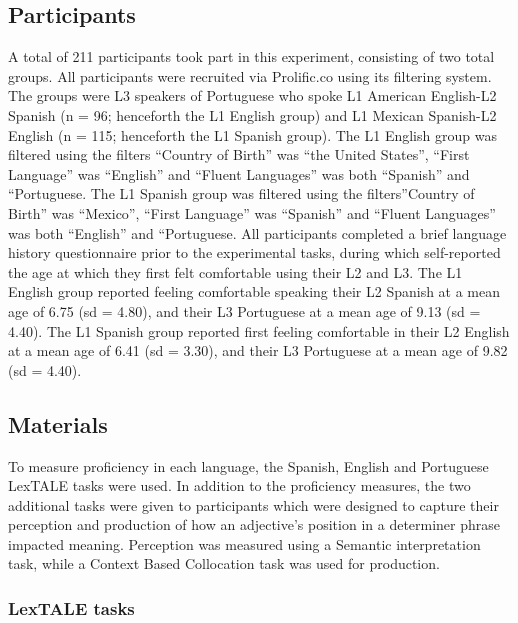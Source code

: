 \documentclass[
  man]{apa6}
\begin{document}
\hypertarget{participants}{%
\subsection{Participants}\label{participants}}

A total of 211 participants took part in this experiment, consisting of two total groups.
All participants were recruited via Prolific.co using its filtering system.
The groups were L3 speakers of Portuguese who spoke L1 American English-L2 Spanish (n = 96; henceforth the L1 English group) and L1 Mexican Spanish-L2 English (n = 115; henceforth the L1 Spanish group).
The L1 English group was filtered using the filters ``Country of Birth'' was ``the United States'', ``First Language'' was ``English'' and ``Fluent Languages'' was both ``Spanish'' and ``Portuguese.
The L1 Spanish group was filtered using the filters''Country of Birth'' was ``Mexico'', ``First Language'' was ``Spanish'' and ``Fluent Languages'' was both ``English'' and ``Portuguese.
All participants completed a brief language history questionnaire prior to the experimental tasks, during which self-reported the age at which they first felt comfortable using their L2 and L3.
The L1 English group reported feeling comfortable speaking their L2 Spanish at a mean age of 6.75 (sd = 4.80), and their L3 Portuguese at a mean age of 9.13 (sd = 4.40).
The L1 Spanish group reported first feeling comfortable in their L2 English at a mean age of 6.41 (sd = 3.30), and their L3 Portuguese at a mean age of 9.82 (sd = 4.40).

\hypertarget{materials}{%
\subsection{Materials}\label{materials}}

To measure proficiency in each language, the Spanish, English and Portuguese LexTALE tasks were used.
In addition to the proficiency measures, the two additional tasks were given to participants which were designed to capture their perception and production of how an adjective's position in a determiner phrase impacted meaning.
Perception was measured using a Semantic interpretation task, while a Context Based Collocation task was used for production.

\hypertarget{lextale-tasks}{%
\subsubsection{LexTALE tasks}\label{lextale-tasks}}
\end{document}
